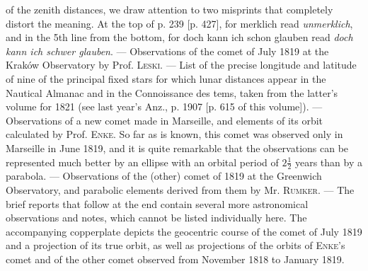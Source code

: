 of the zenith distances, we draw attention to two misprints that completely distort the meaning. At the top of p. 239 [p. 427], for merklich read \emph{unmerklich}, and in the 5th line from the bottom, for doch kann ich schon glauben read \emph{doch kann ich schwer glauben}. --- Observations of the comet of July 1819 at the Kraków Observatory by Prof. \textsc{Leski}. --- List of the precise longitude and latitude of nine of the principal fixed stars for which lunar distances appear in the Nautical Almanac and in the Connoissance des tems, taken from the latter's volume for 1821 (see last year's Anz., p. 1907 [p. 615 of this volume]). --- Observations of a new comet made in Marseille, and elements of its orbit calculated by Prof. \textsc{Enke}. So far as is known, this comet was observed only in Marseille in June 1819, and it is quite remarkable that the observations can be represented much better by an ellipse with an orbital period of $2\frac{1}{2}$
years than by a parabola. --- Observations of the (other) comet of 1819 at the Greenwich Observatory, and parabolic elements derived from them by Mr. \textsc{Rumker}. --- The brief reports that follow at the end contain several more astronomical observations and notes, which cannot be listed individually here. The accompanying copperplate depicts the geocentric course of the comet of July 1819 and a projection of its true orbit, as well as projections of the orbits of \textsc{Enke}'s comet and of the other comet observed from November 1818 to January 1819.
\par\clearpage\endgroup
